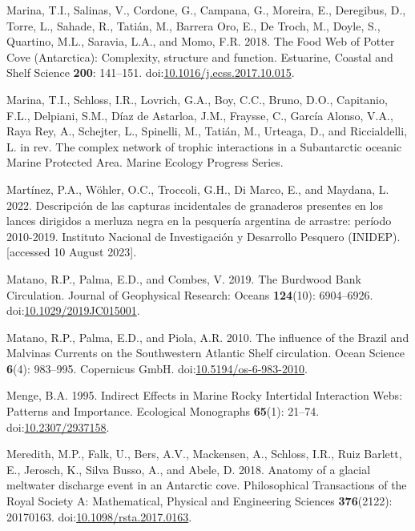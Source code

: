 \documentclass[
]{article}
\newlength{\cslhangindent}
\newenvironment{CSLReferences}[2] %
 {\begin{list}{}{%
  \setlength{\itemindent}{0pt}
  \setlength{\leftmargin}{0pt}
  \setlength{\parsep}{0pt}
  \ifodd #1
   \setlength{\leftmargin}{\cslhangindent}
   \setlength{\itemindent}{-1\cslhangindent}
  \fi
  \setlength{\itemsep}{#2\baselineskip}}}
 {\end{list}}
\begin{document}
\begin{CSLReferences}{1}{0}
Marina, T.I., Salinas, V., Cordone, G., Campana, G., Moreira, E.,
Deregibus, D., Torre, L., Sahade, R., Tatián, M., Barrera Oro, E., De
Troch, M., Doyle, S., Quartino, M.L., Saravia, L.A., and Momo, F.R.
2018. The {Food Web} of {Potter Cove} ({Antarctica}): Complexity,
structure and function. Estuarine, Coastal and Shelf Science
\textbf{200}: 141--151.
doi:\href{https://doi.org/10.1016/j.ecss.2017.10.015}{10.1016/j.ecss.2017.10.015}.

Marina, T.I., Schloss, I.R., Lovrich, G.A., Boy, C.C., Bruno, D.O.,
Capitanio, F.L., Delpiani, S.M., Díaz de Astarloa, J.M., Fraysse, C.,
García Alonso, V.A., Raya Rey, A., Schejter, L., Spinelli, M., Tatián,
M., Urteaga, D., and Riccialdelli, L. in rev. The complex network of
trophic interactions in a {Subantarctic} oceanic {Marine Protected
Area}. Marine Ecology Progress Series.

Martínez, P.A., Wöhler, O.C., Troccoli, G.H., Di Marco, E., and Maydana,
L. 2022. {Descripci{ó}n de las capturas incidentales de granaderos
presentes en los lances dirigidos a merluza negra en la pesquer{í}a
argentina de arrastre: per{í}odo 2010-2019.} Instituto Nacional de
Investigaci{ó}n y Desarrollo Pesquero (INIDEP). {[}accessed 10 August
2023{]}.

Matano, R.P., Palma, E.D., and Combes, V. 2019. The {Burdwood Bank
Circulation}. Journal of Geophysical Research: Oceans \textbf{124}(10):
6904--6926.
doi:\href{https://doi.org/10.1029/2019JC015001}{10.1029/2019JC015001}.

Matano, R.P., Palma, E.D., and Piola, A.R. 2010. The influence of the
{Brazil} and {Malvinas Currents} on the {Southwestern Atlantic Shelf}
circulation. Ocean Science \textbf{6}(4): 983--995. Copernicus GmbH.
doi:\href{https://doi.org/10.5194/os-6-983-2010}{10.5194/os-6-983-2010}.

Menge, B.A. 1995. Indirect {Effects} in {Marine Rocky Intertidal
Interaction Webs}: {Patterns} and {Importance}. Ecological Monographs
\textbf{65}(1): 21--74.
doi:\href{https://doi.org/10.2307/2937158}{10.2307/2937158}.

Meredith, M.P., Falk, U., Bers, A.V., Mackensen, A., Schloss, I.R., Ruiz
Barlett, E., Jerosch, K., Silva Busso, A., and Abele, D. 2018. Anatomy
of a glacial meltwater discharge event in an {Antarctic} cove.
Philosophical Transactions of the Royal Society A: Mathematical,
Physical and Engineering Sciences \textbf{376}(2122): 20170163.
doi:\href{https://doi.org/10.1098/rsta.2017.0163}{10.1098/rsta.2017.0163}.


\end{CSLReferences}
\end{document}
